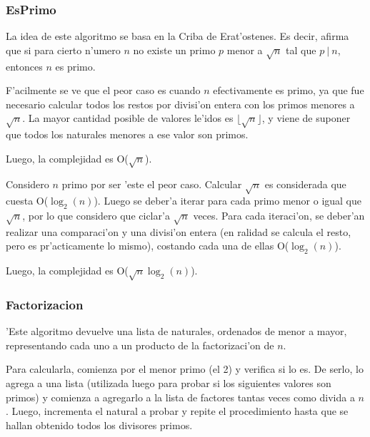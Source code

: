 \subsubsection{EsPrimo}


La idea de este algoritmo se basa en la Criba de Erat'ostenes. Es decir, afirma que si para cierto n'umero $n$ no existe un primo $p$ menor a $\sqrt{n}$ tal que $p\ |\ n$, entonces $n$ es primo. 

F'acilmente se ve que el peor caso es cuando $n$ efectivamente es primo, ya que fue necesario calcular todos los restos por divisi'on entera con los primos menores a $\sqrt{n}$. La mayor cantidad posible de valores le'idos es $\lfloor\sqrt{n}\rfloor$, y viene de suponer que todos los naturales menores a ese valor son primos.

Luego, la complejidad es O($\sqrt{n}$).

\vspace{2em}


Considero $n$ primo por ser 'este el peor caso. Calcular $\sqrt{n}$ es considerada que cuesta O($\log_2(n)$). Luego se deber'a iterar para cada primo menor o igual que $\sqrt{n}$, por lo que considero que ciclar'a $\sqrt{n}$ veces. Para cada iteraci'on, se deber'an realizar una comparaci'on y una divisi'on entera (en ralidad se calcula el resto, pero es pr'acticamente lo mismo), costando cada una de ellas O($\log_2(n)$). 

Luego, la complejidad es O($\sqrt{n}\log_2(n)$).

\vspace{2em}




\subsubsection{Factorizacion}


'Este algoritmo devuelve una lista de naturales, ordenados de menor a mayor, representando cada uno a un producto de la factorizaci'on de $n$. 

Para calcularla, comienza por el menor primo (el 2) y verifica si lo es. De serlo, lo agrega a una lista (utilizada luego para probar si los siguientes valores son primos) y comienza a agregarlo a la lista de factores tantas veces como divida a $n$. Luego, incrementa el natural a probar y repite el procedimiento hasta que se hallan obtenido todos los divisores primos.

